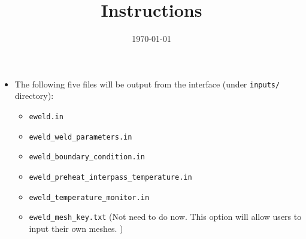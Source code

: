 \documentclass[12pt,letterpaper]{article}
\date{\today}
\title{Instructions}
\newcommand{\verbStyle}[1]{{\color{SteelBlue40}\colorbox{LightSteelBlue10}{{#1}}}}
\let\OldTexttt\texttt
\renewcommand{\texttt}[1]{\OldTexttt{\verbStyle{#1}}}
\begin{document}
\maketitle
\begin{itemize}
\item The following five files will be output from the interface (under \texttt{inputs/} directory):
\begin{itemize}
\item \texttt{eweld.in}
\item \texttt{eweld\_weld\_parameters.in}
\item \texttt{eweld\_boundary\_condition.in}
\item \texttt{eweld\_preheat\_interpass\_temperature.in}
\item \texttt{eweld\_temperature\_monitor.in}
\item \texttt{eweld\_mesh\_key.txt} (Not need to do now. This option will allow users to input their own meshes. )
\end{itemize}


\end{itemize}
\end{document}
